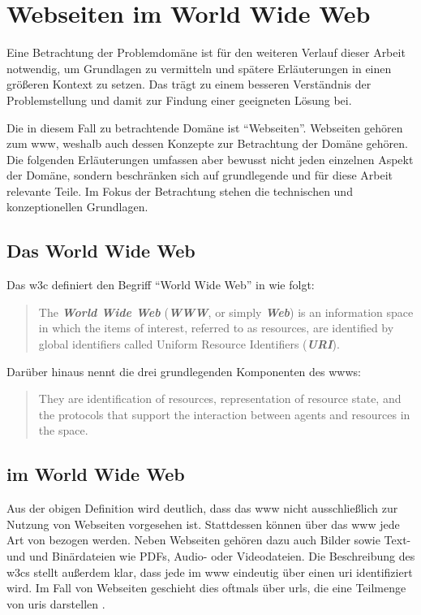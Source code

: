 \section{Webseiten im World Wide Web}
    \label{section:problemAnalysisWebpagesInTheWWW}
    Eine Betrachtung der Problemdomäne ist für den weiteren
    Verlauf dieser Arbeit notwendig,
    um Grundlagen zu vermitteln und spätere Erläuterungen
    in einen größeren Kontext zu setzen.
    Das trägt zu einem besseren Verständnis der Problemstellung
    und damit zur Findung einer geeigneten Lösung bei.

    Die in diesem Fall zu betrachtende Domäne ist "`Webseiten"'.
    Webseiten gehören zum \gls{www}, weshalb auch dessen Konzepte zur Betrachtung der Domäne gehören.
    Die folgenden Erläuterungen umfassen aber bewusst nicht jeden einzelnen Aspekt der Domäne,
    sondern beschränken sich auf grundlegende und für diese Arbeit relevante Teile.
    Im Fokus der Betrachtung stehen die technischen und konzeptionellen Grundlagen.

    \subsection{Das World Wide Web}
        Das \gls{w3c} definiert den Begriff "`World Wide Web"' in \cite{w3c:wwwArch} wie folgt:

        \begin{quote}
            The \textit{\textbf{World Wide Web}} (\textit{\textbf{WWW}}, or simply \textit{\textbf{Web}})
            is an information space in which the items of interest, referred to as resources,
            are identified by global identifiers called Uniform Resource Identifiers (\textit{\textbf{URI}}).
        \end{quote}

        Darüber hinaus nennt \cite{w3c:wwwArch} die drei grundlegenden Komponenten des \glspl{www}:

        \begin{quote}
            They are identification of resources,
            representation of resource state, and the protocols
            that support the interaction between agents and resources in the space.
        \end{quote}

    \subsection{{\resources} im World Wide Web}
        \label{section:problemAnalysisWebpagesInTheWWWResources}
        Aus der obigen Definition wird deutlich,
        dass das \gls{www} nicht ausschließlich zur Nutzung von Webseiten
        vorgesehen ist.
        Stattdessen können über das \gls{www} jede Art von {\resources} bezogen werden.
        Neben Webseiten gehören dazu auch Bilder sowie Text- und
        und Binärdateien wie PDFs, Audio- oder Videodateien.
        Die Beschreibung des \glspl{w3c} stellt außerdem klar,
        dass jede {\resource} im \gls{www} eindeutig über einen \gls{uri} identifiziert wird.
        Im Fall von Webseiten geschieht dies oftmals über \glspl{url},
        die eine Teilmenge von \glspl{uri} darstellen
        \cite[Kapitel 1.1.3, Seite 7]{rfc:3986}.

